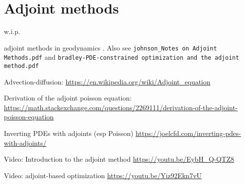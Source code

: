 
\chapter{Adjoint methods} %

{\Large w.i.p.}

adjoint methods in geodynamics \cite{bugs09,ghbu16,hobo14,isks07,ligs17,wahg15,wama09,wosp14}.
Also see {\tt johnson\_Notes on Adjoint Methods.pdf} and {\tt bradley-PDE-constrained optimization and the adjoint method.pdf} 

Advection-diffusion: \url{https://en.wikipedia.org/wiki/Adjoint_equation}

Derivation of the adjoint poisson equation: \url{https://math.stackexchange.com/questions/2269111/derivation-of-the-adjoint-poisson-equation}

Inverting PDEs with adjoints (esp Poisson) \url{https://joelcfd.com/inverting-pdes-with-adjoints/}

Video: Introduction to the adjoint method \url{https://youtu.be/EybH_Q-QTZ8}

Video: adjoint-based optimization \url{https://youtu.be/Yiz92Ekn7vU}
